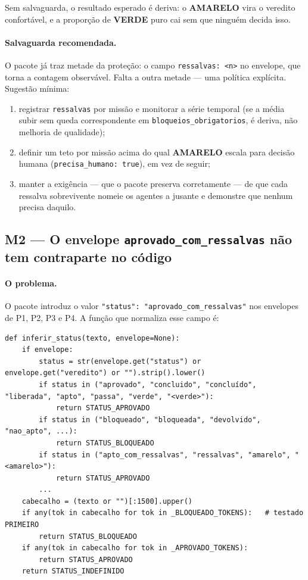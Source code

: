 \documentclass[11pt,a4paper]{article}
\newcommand{\Verde}[1]{\textcolor{verde}{\textbf{#1}}}
\newcommand{\Ambar}[1]{\textcolor{ambar}{\textbf{#1}}}
\newcommand{\cod}[1]{\texttt{\small #1}}
\begin{document}
Sem salvaguarda, o resultado esperado é deriva: o \Ambar{AMARELO} vira o veredito confortável, e a proporção
de \Verde{VERDE} puro cai sem que ninguém decida isso.

\paragraph{Salvaguarda recomendada.} O pacote já traz metade da proteção: o campo \cod{ressalvas: <n>} no
envelope, que torna a contagem observável. Falta a outra metade --- uma política explícita. Sugestão mínima:

\begin{enumerate}[leftmargin=*,itemsep=1pt]
  \item registrar \cod{ressalvas} por missão e monitorar a série temporal (se a média subir sem queda
  correspondente em \cod{bloqueios\_obrigatorios}, é deriva, não melhoria de qualidade);
  \item definir um teto por missão acima do qual \Ambar{AMARELO} escala para decisão humana
  (\cod{precisa\_humano: true}), em vez de seguir;
  \item manter a exigência --- que o pacote preserva corretamente --- de que cada ressalva sobrevivente
  nomeie os agentes a jusante e demonstre que nenhum precisa daquilo.
\end{enumerate}

\subsection{M2 --- O envelope \cod{aprovado\_com\_ressalvas} não tem contraparte no código}
\label{sec:m2}

\paragraph{O problema.} O pacote introduz o valor \cod{"status": "aprovado\_com\_ressalvas"} nos envelopes
de P1, P2, P3 e P4. A função que normaliza esse campo é:

\begin{lstlisting}[caption={\cod{agents/callbacks.py}, linhas 55--73 (estado atual)}]
def inferir_status(texto, envelope=None):
    if envelope:
        status = str(envelope.get("status") or envelope.get("veredito") or "").strip().lower()
        if status in ("aprovado", "concluido", "concluído", "liberada", "apto", "passa", "verde", "<verde>"):
            return STATUS_APROVADO
        if status in ("bloqueado", "bloqueada", "devolvido", "nao_apto", ...):
            return STATUS_BLOQUEADO
        if status in ("apto_com_ressalvas", "ressalvas", "amarelo", "<amarelo>"):
            return STATUS_APROVADO
        ...
    cabecalho = (texto or "")[:1500].upper()
    if any(tok in cabecalho for tok in _BLOQUEADO_TOKENS):   # testado PRIMEIRO
        return STATUS_BLOQUEADO
    if any(tok in cabecalho for tok in _APROVADO_TOKENS):
        return STATUS_APROVADO
    return STATUS_INDEFINIDO
\end{lstlisting}
\end{document}
